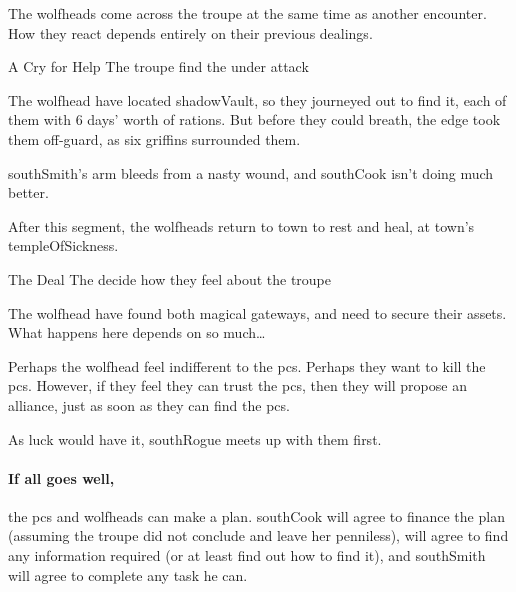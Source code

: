 The \glspl{wolfhead} come across the troupe at the same time as another encounter.
How they react depends entirely on their previous dealings.

{A Cry for Help}%
{The troupe find the  under attack}%

The \gls{wolfhead} have located \gls{shadowVault}, so they journeyed out to find it, each of them with 6 days' worth of rations.
But before they could breath, the \gls{edge} took them off-guard, as six griffins surrounded them.


\Gls{southSmith}'s arm bleeds from a nasty wound, and \gls{southCook} isn't doing much better.

\setcounter{wounds}{3}
\southCook


After this \gls{segment}, the \glspl{wolfhead} return to \gls{town} to rest and heal, at \gls{town}'s \gls{templeOfSickness}.


{The Deal}%
{The  decide how they feel about the troupe}%

The \gls{wolfhead} have found both magical gateways, and need to secure their assets.
What happens here depends on so much\ldots

Perhaps the \gls{wolfhead} feel indifferent to the \glspl{pc}.
Perhaps they want to kill the \glspl{pc}.
However, if they feel they can trust the \glspl{pc}, then they will propose an alliance, just as soon as they can find the \glspl{pc}.

As luck would have it, \gls{southRogue} meets up with them first.

\paragraph{If all goes well,}
the \glspl{pc} and \glspl{wolfhead} can make a plan.
\Gls{southCook} will agree to finance the plan (assuming the troupe did not conclude  and leave her penniless),  will agree to find any information required (or at least find out how to find it), and \gls{southSmith} will agree to complete any task he can.

